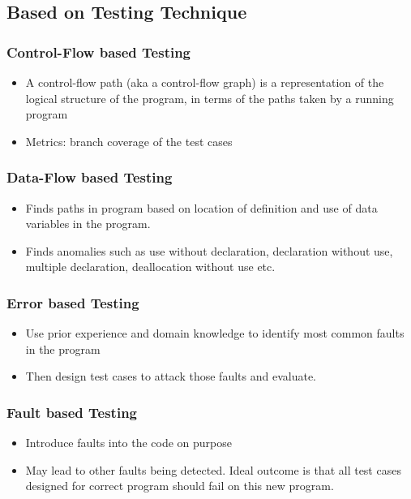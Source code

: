 \documentclass{article}
\begin{document}
\subsection{Based on Testing Technique}
\subsubsection{Control-Flow based Testing}
\begin{itemize}
    \item A control-flow path (aka a control-flow graph) is a representation of the logical structure of the program, in terms of the paths taken by a running program 
    
    \item Metrics: branch coverage of the test cases
\end{itemize}

\subsubsection{Data-Flow based Testing}
\begin{itemize}
    \item Finds paths in program based on location of definition and use of data variables in the program.
    
    \item Finds anomalies such as use without declaration, declaration without use, multiple declaration, deallocation without use etc.
\end{itemize}

\subsubsection{Error based Testing}
\begin{itemize}
    \item Use prior experience and domain knowledge to identify most common faults in the program
    
    \item Then design test cases to attack those faults and evaluate. 
\end{itemize}

\subsubsection{Fault based Testing}
\begin{itemize}
    \item Introduce faults into the code on purpose
    
    \item May lead to other faults being detected. Ideal outcome is that all test cases designed for correct program should fail on this new program.
\end{itemize}
\end{document}
